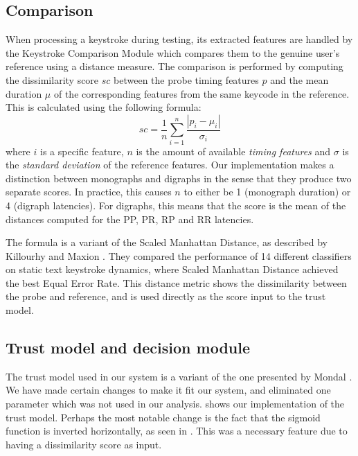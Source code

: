 \subsection{Comparison}
\label{sec:system-design-CA-matching}
When processing a keystroke during testing, its extracted features are handled by the Keystroke Comparison Module which compares them to the genuine user's reference using a distance measure.
The comparison is performed by computing the dissimilarity score $sc$ between the probe timing features $p$ and the mean duration $\mu$ of the corresponding features from the same keycode in the reference.
This is calculated using the following formula:
$$ sc=\frac{1}{n}\sum_{i=1}^{n}\frac{|p_i-\mu_i|}{\sigma_i} $$
where $i$ is a specific feature, $n$ is the amount of available \textit{timing features} and $\sigma$ is the \textit{standard deviation} of the reference features.
Our implementation makes a distinction between monographs and digraphs in the sense that they produce two separate scores.
In practice, this causes $n$ to either be 1 (monograph duration) or 4 (digraph latencies).
For digraphs, this means that the score is the mean of the distances computed for the PP, PR, RP and RR latencies.

The formula is a variant of the Scaled Manhattan Distance, as described by Killourhy and Maxion \cite{Killourhy}.
They compared the performance of 14 different classifiers on static text keystroke dynamics, where Scaled Manhattan Distance achieved the best Equal Error Rate.
This distance metric shows the dissimilarity between the probe and reference, and is used directly as the score input to the trust model.


\subsection{Trust model and decision module}
\label{sec:CA-trust-and-decision}
The trust model used in our system is a variant of the one presented by Mondal \cite{mondal}.
We have made certain changes to make it fit our system, and eliminated one parameter which was not used in our analysis.
 shows our implementation of the trust model.
Perhaps the most notable change is the fact that the sigmoid function is inverted horizontally, as seen in .
This was a necessary feature due to having a dissimilarity score as input.

